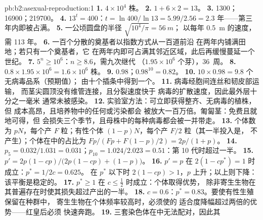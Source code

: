 \begin{solution}{pb:b2:asexual-reproduction:1}
\textbf{1.} $4\times 10^{4}$ 株。
\textbf{2.} $1 + 6\times 2 = 13$。
\textbf{3.} \num{1300}；\num{16900}；\num{219700}。
\textbf{4.} $13^{t} = 400$：$t = \ln 400/\ln 13 = 5.99/2.56 = 2.3$
年——第三年内即被占满。
\textbf{5.} 一公顷圆盘的半径 $\sqrt{10^{4}/\pi} = \qty{56}{m}$；
以每年 \qty{0.5}{m} 的速度，需 \num{113} 年。
\textbf{6.} 一百个分散的奠基者以指数方式从一百道前沿
在两年内铺满田地；若只有一个奠基者，它
在两年内即可占满其邻近区域，此后再缓慢蔓延一个世纪。
\textbf{7.} $5^{n} \ge 10^{6}$：$n \ge 8.6$，需九次继代
（$1.95\times 10^{6}$ 个芽），36~周。
\textbf{8.} $0.8\times 1.95\times 10^{6} = 1.6\times 10^{6}$ 株。
\textbf{9.} $0.98$；$0.98^{10} = 0.82$。
\textbf{10.} $10\times 0.98 = 9.8$ 个无病毒品系（预期值）；
由十个插条中得到一个。
\textbf{11.} 病毒经胞间连丝和韧皮部运输，
而茎尖圆顶没有维管连接，且分裂速度快于
病毒的扩散速度，因此最外层十分之一毫米
通常未被感染。
\textbf{12.} 实验室方法：可立即获得整齐、无病毒的植株，但
成本高昂，且培养物中的任何或污染都会
被放大一百万倍。匍匐茎：免费且就地可得，但
会损失三个季节，且母株中的每种病毒都会被一并带走。
\textbf{13.} 个体数为 $pN$，每个产 $F$ 粒；有性个体
$(1 - p)N$，每个产 $F/2$ 粒（其一半投入是，
不产生）；个体在中的占比为 $Fp/(Fp + F(1 - p)/2)
= 2p/(1 + p)$。
\textbf{14.} $p_5 = 0.032/1.031 = 0.031$；$p_{10} = 1.024/2.023 =
0.51$：第 10 代时超过一半。
\textbf{15.} $p' = 2p(1 - cp)/\bigl(2p(1 - cp) + (1 - p)\bigr)$。
\textbf{16.} $p' = p$ 在 $2(1 - cp^*) = 1$ 时成立：$p^* = 1/2c = 0.625$。
在 $p^*$ 以下时 $2(1 - cp) > 1$，$p$ 上升；以上则下降：该平衡是稳定的。
\textbf{17.} $p^* \ge 1$ 在 $c \le \tfrac12$ 时成立：个体取得优势，
除非寄生生物在其普遍存在时使其损失超过产出的一半。
\textbf{18.} $c = 0.6$：$p^* = 0.83$。要使有性生殖保留在种群中，
寄生生物在个体频率较高时，必须使的
适合度降幅超过两倍的优势——红皇后必须
快速奔跑。
\textbf{19.} 三套染色体在中无法配对，因此其

\end{solution}
